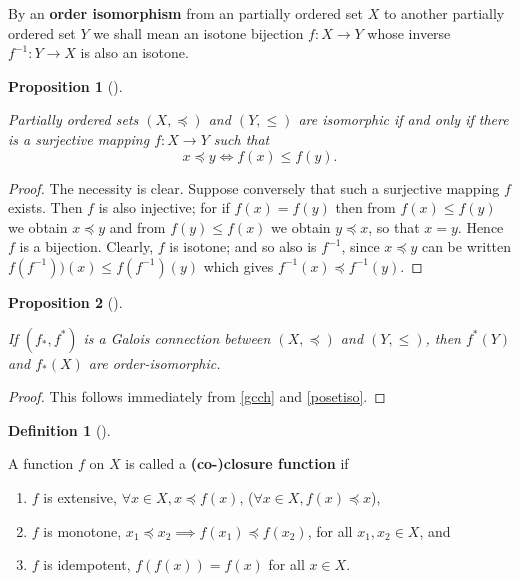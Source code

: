 \documentclass[
  twoside,
  12pt,
  letterpaper,
  fleqn]{article}
\providecommand{\tightlist}{%
  \setlength{\itemsep}{0pt}\setlength{\parskip}{0pt}}\usepackage{longtable,booktabs,array}
\theoremstyle{definition}
\theoremstyle{definition}
\newtheorem{definition}{Definition}[section]
\theoremstyle{plain}
\newtheorem{proposition}{Proposition}[section]
\theoremstyle{remark}
\begin{document}
By an \textbf{order isomorphism} from an partially ordered set \(X\) to
another partially ordered set \(Y\) we shall mean an isotone bijection
\(f:X\to Y\) whose inverse \(f^{-1}: Y\to X\) is also an isotone.

\begin{proposition}[]\protect\hypertarget{prp-isomorphic-ordered-sets}{}\label{prp-isomorphic-ordered-sets}

Partially ordered sets \((X,\preceq)\) and \((Y,\leqslant)\) are
isomorphic if and only if there is a surjective mapping \(f:X\to Y\)
such that \[
x\preceq y \Longleftrightarrow f(x)\leqslant f(y).
\]

\end{proposition}

\begin{proof}

The necessity is clear. Suppose conversely that such a surjective
mapping \(f\) exists. Then \(f\) is also injective; for if \(f(x)=f(y)\)
then from \(f(x)\leqslant f(y)\) we obtain \(x\preceq y\) and from
\(f(y)\leqslant f(x)\) we obtain \(y\preceq x\), so that \(x=y\). Hence
\(f\) is a bijection. Clearly, \(f\) is isotone; and so also is
\(f^{-1}\), since \(x\preceq y\) can be written
\(f(f^{-1}))(x)\leqslant f(f^{-1})(y)\) which gives
\(f^{-1}(x)\preceq f^{-1}(y)\).

\end{proof}

\begin{proposition}[]\protect\hypertarget{prp-galois-connection-order-isomorphic}{}\label{prp-galois-connection-order-isomorphic}

\label{calcprop1} If \((f_*, f^*)\) is a Galois connection between
\((X,\preceq)\) and \((Y,\leqslant)\), then \(f^*(Y)\) and \(f_*(X)\)
are order-isomorphic.

\end{proposition}

\begin{proof}

This follows immediately from \eqref{gcch} and \eqref{posetiso}.

\end{proof}

\begin{definition}[]\protect\hypertarget{def-closure-function}{}\label{def-closure-function}

A function \(f\) on \(X\) is called a \textbf{(co-)closure function} if

\begin{enumerate}
\def\labelenumi{\arabic{enumi}.}
\tightlist
\item
  \(f\) is extensive, \(\forall x\in X, x\preceq f(x)\),
  (\(\forall x\in X, f(x)\preceq x\)),
\item
  \(f\) is monotone, \(x_1\preceq x_2\implies f(x_1)\preceq f(x_2)\),
  for all \(x_1, x_2\in X\), and
\item
  \(f\) is idempotent, \(f(f(x))=f(x)\) for all \(x\in X\).
\end{enumerate}

\end{definition}
\end{document}
